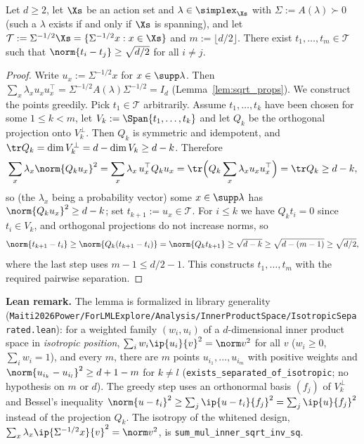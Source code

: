\begin{lemma}\label{lem:whitened_separated_points}
\leanok
{}
Let $d \ge 2$, let $\Xs$ be an action set and $\lambda \in \simplex_{\Xs}$ with
$\Sigma := A(\lambda) \succ 0$ (such a $\lambda$ exists if and only if $\Xs$ is spanning), and let
$\mathcal T := \Sigma^{-1/2}\Xs = \{\Sigma^{-1/2}x : x \in \Xs\}$ and $m := \lfloor d/2 \rfloor$.
There exist $t_1, \dots, t_m \in \mathcal T$ such that $\norm{t_i - t_j} \ge \sqrt{d/2}$
for all $i \ne j$.
\end{lemma}

\begin{proof}
\leanok
{}
Write $u_x := \Sigma^{-1/2}x$ for $x \in \supp\lambda$. Then
$\sum_{x}\lambda_x u_xu_x^\top = \Sigma^{-1/2}A(\lambda)\Sigma^{-1/2} = I_d$
(Lemma~\ref{lem:sqrt_props}). We construct the points greedily. Pick $t_1 \in \mathcal T$
arbitrarily. Assume $t_1,\dots,t_k$ have been chosen for some $1 \le k < m$, let
$V_k := \Span\{t_1,\dots,t_k\}$ and let $Q_k$ be the orthogonal projection onto
$V_k^\perp$. Then $Q_k$ is symmetric and idempotent, and
$\tr Q_k = \dim V_k^\perp = d - \dim V_k \ge d - k$. Therefore
\[
  \sum_x \lambda_x \norm{Q_k u_x}^2 = \sum_x\lambda_x\, u_x^\top Q_k u_x
  = \tr\Big(Q_k \sum_x\lambda_x u_xu_x^\top\Big) = \tr Q_k \ge d - k ,
\]
so (the $\lambda_x$ being a probability vector) some $x \in \supp\lambda$ has
$\norm{Q_ku_x}^2 \ge d-k$; set $t_{k+1} := u_x \in \mathcal T$. For $i \le k$ we have
$Q_kt_i = 0$ since $t_i \in V_k$, and orthogonal projections do not increase norms, so
\[
  \norm{t_{k+1} - t_i} \ge \norm{Q_k(t_{k+1}-t_i)} = \norm{Q_kt_{k+1}} \ge \sqrt{d-k}
  \ge \sqrt{d - (m-1)} \ge \sqrt{d/2},
\]
where the last step uses $m - 1 \le d/2 - 1$. This constructs $t_1,\dots,t_m$ with the
required pairwise separation.
\end{proof}

\textbf{Lean remark.} The lemma is formalized in library generality
(\texttt{Maiti2026Power/ForLMLExplore/Analysis/InnerProductSpace/IsotropicSeparated.lean}): for a weighted
family $(w_i, u_i)$ of a $d$-dimensional inner product space in \emph{isotropic position},
$\sum_i w_i\ip{u_i}{v}^2 = \norm v^2$ for all $v$ ($w_i \ge 0$, $\sum_i w_i = 1$), and every
$m$, there are $m$ points $u_{i_1},\dots,u_{i_m}$ with positive weights and
$\norm{u_{i_k} - u_{i_l}}^2 \ge d + 1 - m$ for $k \ne l$ (\texttt{exists\_separated\_of\_isotropic};
no hypothesis on $m$ or $d$). The greedy step uses an orthonormal basis $(f_j)$ of
$V_k^\perp$ and Bessel's inequality $\norm{u - t_i}^2 \ge \sum_j\ip{u - t_i}{f_j}^2 = \sum_j\ip{u}{f_j}^2$
instead of the projection $Q_k$. The isotropy of the whitened design,
$\sum_x\lambda_x\ip{\Sigma^{-1/2}x}{v}^2 = \norm v^2$, is \texttt{sum\_mul\_inner\_sqrt\_inv\_sq}.

